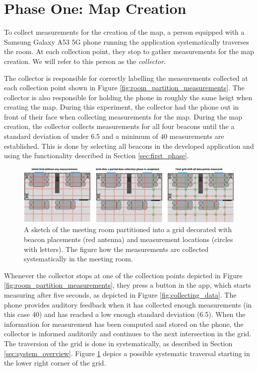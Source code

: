 \section{Phase One: Map Creation}\label{sec:eval_phase1}
To collect measurements for the creation of the map, a person equipped with a Samsung Galaxy A53 5G phone running the application systematically traverses the room. 
At each collection point, they stop to gather measurements for the map creation.
We will refer to this person as the \textit{collector}.

The collector is responsible for correctly labelling the measurements collected at each collection point shown in Figure \ref{fig:room_partition_measurements}. 
The collector is also responsible for holding the phone in roughly the same heigt when creating the map. 
During this experiment, the collector had the phone out in front of their face when collecting measurements for the map. 
During the map creation, the collector collects measurements for all four beacons until the a standard deviation of under 6.5  and a minimum of $40$ measurements are established.
This is done by selecting all beacons in the developed application and using the functionality described in Section \ref{sec:first_phase}.

\begin{figure}[h]
    \centering
    \includegraphics[width=\textwidth]{images/experiment_map_creation.png}
    \caption{A sketch of the meeting room partitioned into a grid decorated with beacon placements (red antenna) and measurement locations (circles with letters). The figure how the measurements are collected systematically in the meeting room.}
    \label{fig:experiment_map_creation}
\end{figure}
Whenever the collector stops at one of the collection points depicted in Figure \ref{fig:room_partition_measurements}, they press a button in the app, which starts measuring after five seconds, as depicted in Figure \ref{fig:collecting_data}.
The phone provides auditory feedback when it has collected enough measurements (in this case 40) and has reached a low enough standard deviation (6.5).
When the information for measurement has been computed and stored on the phone, the collector is informed auditorily and continues to the next intersection in the grid. 
The traversion of the grid is done in systematically, as described in Section \ref{sec:system_overview}. 
Figure \ref{fig:experiment_map_creation} depics a possible systematic traversal starting in the lower right corner of the grid. 


